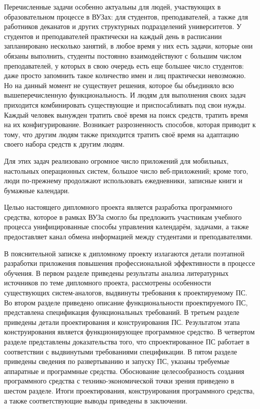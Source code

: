 Перечисленные задачи особенно актуальны для людей, участвующих в образовательном процессе в ВУЗах: для студентов, преподавателей, а также для работников деканатов и других структурных подразделений университетов. У студентов и преподавателей практически на каждый день в расписании запланировано несколько занятий, в любое время у них есть задачи, которые они обязаны выполнить, студенты постоянно взаимодействуют с большим числом преподавателей, у которых в свою очередь есть еще большее число студентов: даже просто запомнить такое количество имен и лиц практически невозможно. Но на данный момент не существует решения, которое бы объединяло всю вышеперечисленную функциональность. И людям для выполнения своих задач приходится комбинировать существующие и приспосабливать под свои нужды. Каждый человек вынужден тратить своё время на поиск средств, тратить время на их конфигурирование. Возникает разрозненность способов, которая приводит к тому, что другим людям также приходится тратить своё время на адаптацию своего набора средств к другим людям. 

Для этих задач реализовано огромное число приложений для мобильных, настольных операционных систем, большое число  веб-приложений; кроме того, люди по-прежнему продолжают использовать ежедневники, записные книги и бумажные календари.

Целью настоящего дипломного проекта является разработка программного средства, которое в рамках ВУЗа смогло бы предложить участникам учебного процесса унифицированные способы управления календарём, задачами, а также предоставляет канал обмена информацией между студентами и преподавателями. 

В пояснительной записке к дипломному проекту излагаются детали поэтапной разработки приложения повышения профессиональной эффективности в процессе обучения. В первом разделе приведены результаты анализа литературных источников по теме дипломного проекта, рассмотрены особенности существующих систем-аналогов, выдвинуты требования к проектируемому ПС. Во втором разделе приведено описание функциональности проектируемого ПС, представлена спецификация функциональных требований. В третьем разделе приведены детали проектирования и конструирования ПС. Результатом этапа конструирования является функционирующее программное средство. В четвертом разделе представлены доказательства того, что спроектированное ПС работает в соответствии с выдвинутыми требованиями спецификации. В пятом разделе приведены сведения по развертыванию и запуску ПС, указаны требуемые аппаратные и программные средства. Обоснование целесообразность создания программного средства с технико-экономической точки зрения приведено в шестом разделе. Итоги проектирования, конструирования программного средства, а также соответствующие выводы приведены в заключении.
